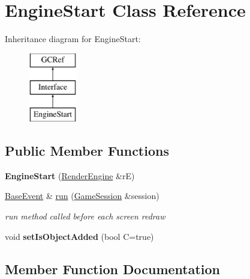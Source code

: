 \hypertarget{classEngineStart}{}\section{Engine\+Start Class Reference}
\label{classEngineStart}
Inheritance diagram for Engine\+Start\+:\begin{figure}[H]
\begin{center}
\leavevmode
\includegraphics[height=3.000000cm]{classEngineStart}
\end{center}
\end{figure}
\subsection*{Public Member Functions}
\begin{DoxyCompactItemize}
\item 
\hypertarget{classEngineStart_aa40d0a5b9d72a3ce33a8f8fa99656b08}{}{\bfseries Engine\+Start} (\hyperlink{classRenderEngine}{Render\+Engine} \&r\+E)\label{classEngineStart_aa40d0a5b9d72a3ce33a8f8fa99656b08}

\item 
\hyperlink{classBaseEvent}{Base\+Event} \& \hyperlink{classEngineStart_a9caa9db3213371e5a77f1b09576a04fa}{run} (\hyperlink{classGameSession}{Game\+Session} \&session)
\begin{DoxyCompactList}\small\item\em run method called before each screen redraw \end{DoxyCompactList}\item 
\hypertarget{classEngineStart_aa69bfc21de9586ba2058aa07d9790b02}{}void {\bfseries set\+Is\+Object\+Added} (bool C=true)\label{classEngineStart_aa69bfc21de9586ba2058aa07d9790b02}

\end{DoxyCompactItemize}


\subsection{Member Function Documentation}
\hypertarget{classEngineStart_a9caa9db3213371e5a77f1b09576a04fa}{}
